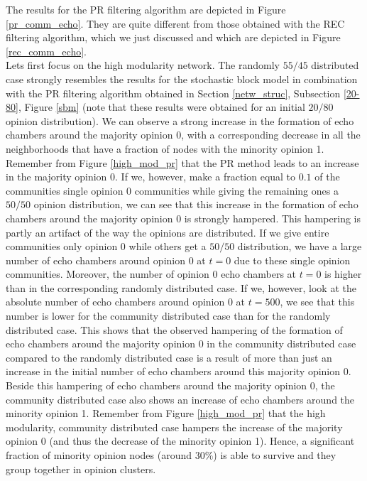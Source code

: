 \documentclass[11 pt , letterpaper , twoside , openright]{book}
\begin{document}
\newpage
\noindent    %
The results for the PR filtering algorithm are depicted in Figure \ref{pr_comm_echo}. They are quite different from those obtained with the REC filtering algorithm, which we just discussed and which are depicted in Figure \ref{rec_comm_echo}.\\
Lets first focus on the high modularity network. The randomly $55/45$ distributed case strongly resembles the results for the stochastic block model in combination with the PR filtering algorithm obtained in Section \ref{netw_struc}, Subsection \ref{20-80}, Figure \ref{sbm} (note that these results were obtained for an initial $20/80$ opinion distribution). We can observe a strong increase in the formation of echo chambers around the majority opinion 0, with a corresponding decrease in all the neighborhoods that have a fraction of nodes with the minority opinion 1. Remember from Figure \ref{high_mod_pr} that the PR method leads to an increase in the majority opinion 0. If we, however, make a fraction equal to $0.1$ of the communities single opinion 0 communities while giving the remaining ones a $50/50$ opinion distribution, we can see that this increase in the formation of echo chambers around the majority opinion 0 is strongly hampered. This hampering is partly an artifact of the way the opinions are distributed. If we give entire communities only opinion 0 while others get a $50/50$ distribution, we have a large number of echo chambers around opinion 0 at $t=0$ due to these single opinion communities. Moreover, the number of opinion 0 echo chambers at $t=0$ is higher than in the corresponding randomly distributed case. If we, however, look at the absolute number of echo chambers around opinion 0 at $t=500$, we see that this number is lower for the community distributed case than for the randomly distributed case. This shows that the observed hampering of the formation of echo chambers around the majority opinion 0 in the community distributed case compared to the randomly distributed case is a result of more than just an increase in the initial number of echo chambers around this majority opinion 0. Beside this hampering of echo chambers around the majority opinion 0, the community distributed case also shows an increase of echo chambers around the minority opinion 1. Remember from Figure \ref{high_mod_pr} that the high modularity, community distributed case hampers the increase of the majority opinion 0 (and thus the decrease of the minority opinion 1). Hence, a significant fraction of minority opinion nodes (around $30 \%$) is able to survive and they group together in opinion clusters.\\  %
\end{document}
